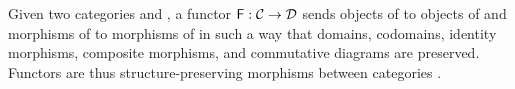 \begin{definition}
\begin{figure}[htbp]
\begin{center}
    \end{center}
    \caption{}
    \label{fig:functor-composition}
  \end{figure}
\end{definition}

\begin{remark}
  \label{re:functor}

  Given two categories  and , a functor $\mathsf{F}:
  \mathcal{C} \to \mathcal{D}$ sends objects of  to objects of 
  and morphisms of  to morphisms of  in such a way that
  domains, codomains, identity morphisms, composite morphisms, and
  commutative diagrams are preserved. Functors are thus
  structure-preserving morphisms between categories
  \parencite[10]{marquis-2013}.
\end{remark}


